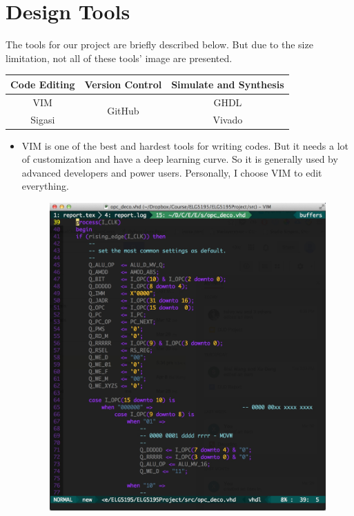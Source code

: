 \documentclass[12pt,a4paper]{report}
\begin{document}
\section{Design Tools}
The tools for our project are briefly described below. But due to the size limitation, not all of these tools' image are presented.
\begin{center}
  \begin{tabular}[h]{|c|c|c|}
    \hline
    {\bf Code Editing} & {\bf Version Control } & {\bf Simulate and Synthesis}  \\ \hline
    VIM & \multirow{2}{*}{GitHub} & GHDL \\
    Sigasi & & Vivado \\ \hline
  \end{tabular}
\end{center}
\begin{itemize}
  \item VIM is one of the best and hardest tools for writing codes. But it needs a lot of customization and have a deep learning curve. So it is generally used by advanced developers and power users. Personally, I choose VIM to edit everything.
    \begin{figure}[h]
      \centering
      \includegraphics[width=\textwidth]{VIM}

\end{figure}
\end{itemize}
\end{document}
